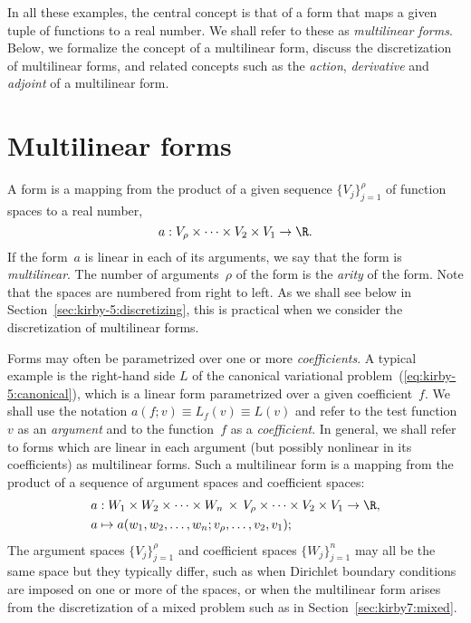 In all these examples, the central concept is that of a form that maps
a given tuple of functions to a real number. We shall refer to these
as \emph{multilinear forms}. Below, we formalize the concept of a
multilinear form, discuss the discretization of multilinear forms, and
related concepts such as the \emph{action}, \emph{derivative} and
\emph{adjoint} of a multilinear form.

\section{Multilinear forms}

A form is a mapping from the product of a given sequence
$\{V_j\}_{j=1}^{\rho}$ of function spaces to a real number,
\begin{equation}
  a : V_{\rho} \times \cdots \times V_2 \times V_1 \rightarrow \R.
\end{equation}
If the form~$a$ is linear in each of its arguments, we say that the
form is \emph{multilinear}. The number of arguments~$\rho$ of the form
is the \emph{arity} of the form. Note that the spaces are numbered
from right to left. As we shall see below in
Section~\ref{sec:kirby-5:discretizing}, this is practical when we
consider the discretization of multilinear forms.

Forms may often be parametrized over one or more
\emph{coefficients}. A typical example is the right-hand side $L$ of
the canonical variational problem~(\ref{eq:kirby-5:canonical}), which
is a linear form parametrized over a given coefficient~$f$. We shall
use the notation $a(f; v) \equiv L_f(v) \equiv L(v)$ and refer to the
test function~$v$ as an \emph{argument} and to the function~$f$ as a
\emph{coefficient}. In general, we shall refer to forms which are
linear in each argument (but possibly nonlinear in its coefficients)
as multilinear forms. Such a multilinear form is a mapping from the
product of a sequence of argument spaces and coefficient spaces:
\begin{equation}
  \begin{split}
    a &: W_1 \times W_2 \times \cdots \times W_n \, \times \,
         V_{\rho} \times \cdots \times V_2 \times V_1 \rightarrow \R, \\
    a &\mapsto a(w_1, w_2, \ldots, w_n; v_{\rho}, \ldots, v_2, v_1);
  \end{split}
\end{equation}
The argument spaces $\{V_j\}_{j=1}^{\rho}$ and coefficient spaces
$\{W_j\}_{j=1}^n$ may all be the same space but they typically differ,
such as when Dirichlet boundary conditions are imposed on one or more
of the spaces, or when the multilinear form arises from the
discretization of a mixed problem such as in
Section~\ref{sec:kirby7:mixed}.

